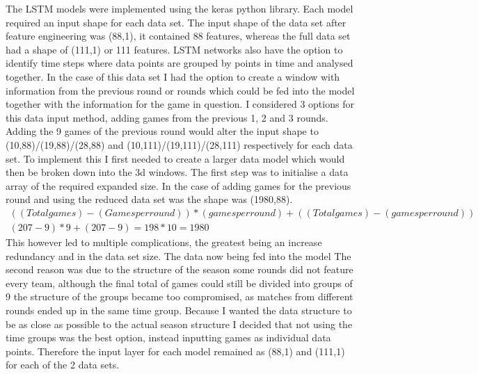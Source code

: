 \documentclass{imc-inf}
\begin{document}
	The LSTM models were implemented using the keras python library. 
	Each model required an input shape for each data set. The input shape of the data set after feature engineering was (88,1), it contained 88 features, whereas the full data set had a shape of (111,1) or 111 features. LSTM networks also have the option to identify time steps where data points are grouped by points in time and analysed together. In the case of this data set I had the option to create a window with information from the previous round or rounds which could be fed into the model together with the information for the game in question. I considered 3 options for this data input method, adding games from the previous 1, 2 and 3 rounds. Adding the 9 games of the previous round would alter the input shape to (10,88)/(19,88)/(28,88) and (10,111)/(19,111)/(28,111) respectively for each data set. To implement this I first needed to create a larger data model which would then be broken down into the 3d windows. The first step was to initialise a data array of the required expanded size. In the case of adding games for the previous round and using the reduced data set was the shape was (1980,88).
	\begin{equation}
		\begin{array}{l}
			((Total games) - (Games per round )) * (games per round) + ((Total games) - (games per round)) \\
			(207 - 9) * 9 + (207 - 9) = 198 * 10 = 1980
		\end{array}
	\end{equation}
	This however led to multiple complications, the greatest being an increase redundancy and in the data set size. The data now being fed into the model  The second reason was due to the structure of the season some rounds did not feature every team, although the final total of games could still be divided into groups of 9 the structure of the groups became too compromised, as matches from different rounds ended up in the same time group. Because I wanted the data structure to be as close as possible to the actual season structure I decided that not using the time groups was the best option, instead inputting games as individual data points. Therefore the input layer for each model remained as (88,1) and (111,1) for each of the 2 data sets.
	\newline 
	
\end{document}
